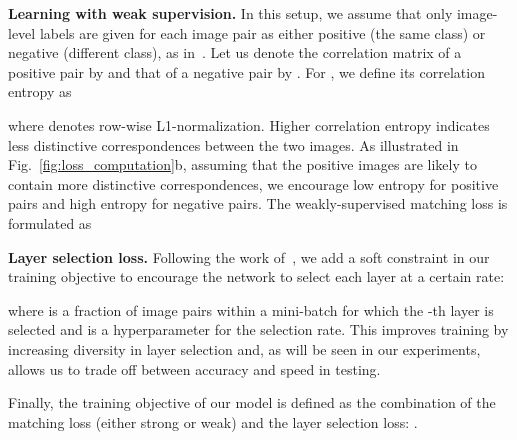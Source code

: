 \documentclass[runningheads]{llncs}
\begin{document}
\smallbreak
\noindent \textbf{Learning with weak supervision.} In this setup, we assume that only image-level labels are given for each image pair as either positive (the same class) or negative (different class), as in~\cite{huang2019dynamic,rocco2018neighbourhood}.
Let us denote the correlation matrix of a positive pair by   and that of a negative pair by .
For , we define its correlation entropy as 

where  denotes row-wise L1-normalization. Higher correlation entropy indicates less distinctive correspondences between the two images. As illustrated in Fig.~\ref{fig:loss_computation}b, assuming that the positive images are likely to contain more distinctive correspondences, we encourage low entropy for positive pairs and high entropy for negative pairs.
The weakly-supervised matching loss is formulated as 


\smallbreak
\noindent \textbf{Layer selection loss.} 
Following the work of~\cite{veit2018convolutional}, we add a soft constraint in our training objective to encourage the network to select each layer at a certain rate: 

where  is a fraction of image pairs within a mini-batch for which the -th layer is selected and  is a hyperparameter for the selection rate.
This improves training by increasing diversity in layer selection and, as will be seen in our experiments, allows us to trade off between accuracy and speed in testing.    

Finally, the training objective of our model is defined as the combination of the matching loss (either strong or weak) and the layer selection loss: .
 
\end{document}
